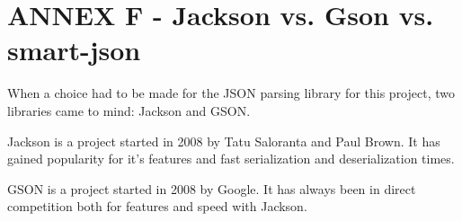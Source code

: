 \documentclass{article}
\begin{document}
\section{ANNEX F - Jackson vs. Gson vs. smart-json}

When a choice had to be made for the JSON parsing library for this project, two
libraries came to mind: Jackson and GSON.\newline

Jackson is a project started in 2008 by Tatu Saloranta and Paul Brown. It has
gained popularity for it's features and fast serialization and deserialization
times.\newline

GSON is a project started in 2008 by Google. It has always been in direct
competition both for features and speed with Jackson.\newline
\end{document}
